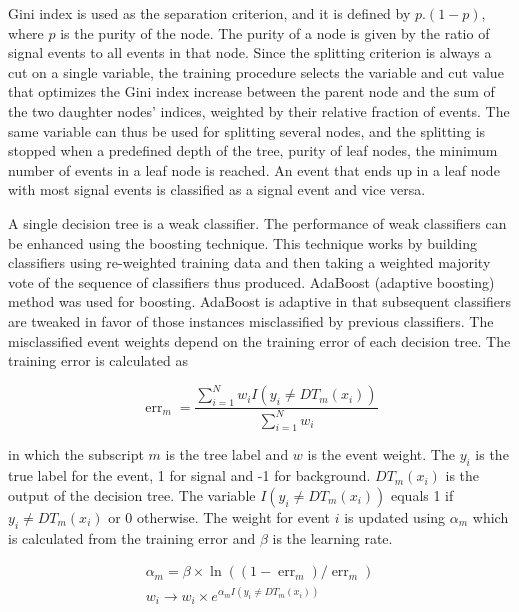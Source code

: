 Gini index is used as the separation criterion, and it is defined by $p.(1 - p)$, where $p$ is the purity of the node. The purity of a node is given by the ratio of signal events to all events in that node. Since the splitting criterion is always a cut on a single variable, the training procedure selects the variable and cut value that optimizes the Gini index increase between the parent node and the sum of the two daughter nodes' indices, weighted by their relative fraction of events. The same variable can thus be used for splitting several nodes, and the splitting is stopped when a predefined depth of the tree, purity of leaf nodes, the minimum number of events in a leaf node is reached. An event that ends up in a leaf node with most signal events is classified as a signal event and vice versa.

A single decision tree is a weak classifier. The performance of weak classifiers can be enhanced using the boosting technique. This technique works by building classifiers using re-weighted training data and then taking a weighted majority vote of the sequence of classifiers thus produced. AdaBoost (adaptive boosting) method was used for boosting. AdaBoost is adaptive in that subsequent classifiers are tweaked in favor of those instances misclassified by previous classifiers. The misclassified event weights depend on the training error of each decision tree. The training error is calculated as

\begin{equation}
  \operatorname{err}_{m}=\frac{\sum_{i=1}^{N} w_{i} I\left(y_{i} \neq DT_{m}\left(x_{i}\right)\right)}{\sum_{i=1}^{N} w_{i}}
\end{equation}

in which the subscript $m$ is the tree label and $w$ is the event weight. The $y_{i}$ is the true label for the event, 1 for signal and -1 for background. $DT_{m}(x_{i})$ is the output of the decision tree. The variable $I(y_{i} \neq DT_{m}(x_{i}))$ equals 1 if $y_{i} \neq DT_{m}(x_{i})$ or 0 otherwise. The weight for event $i$ is updated using $\alpha_{m}$ which is calculated from the training error and $\beta$ is the learning rate.

\begin{align}
  \alpha_{m}=\beta \times \ln \left(\left(1-\operatorname{err}_{m}\right) / \operatorname{err}_{m}\right) \\
  w_{i} \rightarrow w_{i} \times e^{\alpha_{m} I\left(y_{i} \neq DT_{m}\left(x_{i}\right)\right)}
\end{align}

